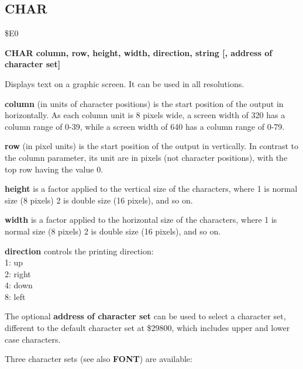 
\newpage
\subsection{CHAR}
\begin{description}[leftmargin=2cm,style=nextline]
\item [Token:] \$E0
\item [Format:] {\bf CHAR column, row, height, width, direction, string
                [, address of character set]}
\item [Usage:]  Displays text on a graphic screen.
                It can be used in all resolutions.

                {\bf column} (in units of character positions) is the
                start position of the output in horizontally.
                As each column unit is 8 pixels wide, a screen width of 320
                has a column range of 0-39, while a screen width of 640
                has a column range of 0-79.

                {\bf row} (in pixel units) is the start position of the output
                in vertically. In contrast to the column parameter,
                its unit are in pixels (not character positions), with the top
                row having the value 0.

                {\bf height} is a factor applied to the vertical
                size of the characters, where 1 is normal size (8 pixels)
                2 is double size (16 pixels), and so on.

                {\bf width} is a factor applied to the horizontal
                size of the characters, where 1 is normal size (8 pixels)
                2 is double size (16 pixels), and so on.

                {\bf direction} controls the printing direction: \\
                1: up     \\
                2: right  \\
                4: down   \\
                8: left

                The optional {\bf address of character set} can be used
                to select a character set, different to the default
                character set at \$29800, which includes upper and lower case
                characters.

                Three character sets (see also {\bf FONT}) are available:


\end{description}
